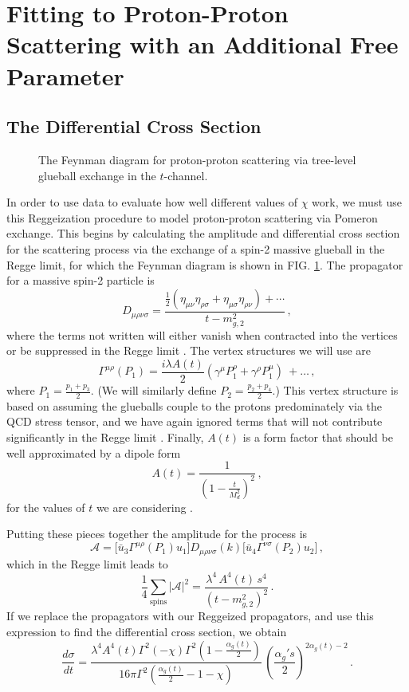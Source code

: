 \documentclass[aps, prd, preprintnumbers, floatfix, showpacs, showkeys, nofootinbib, 10pt]{revtex4-1}
\def\beq{\begin{equation}}
\def\eeq{\end{equation}}
\begin{document}
\section{\label{fitting} Fitting to Proton-Proton Scattering with an Additional Free Parameter}

\subsection{\label{fitfunction} The Differential Cross Section}

\begin{figure}
\begin{center}
\caption{\label{feyn} The Feynman diagram for proton-proton scattering via tree-level glueball exchange in the $t$-channel.}
\end{center}
\end{figure}

In order to use data to evaluate how well different values of $\chi$ work, we must use this Reggeization procedure to model proton-proton scattering via Pomeron exchange.  This begins by calculating the amplitude and differential cross section for the scattering process via the exchange of a spin-2 massive glueball in the Regge limit, for which the Feynman diagram is shown in FIG. \ref{feyn}.  The propagator for a massive spin-2 particle is 
\beq
D_{\mu\rho\nu\sigma} = \frac{\frac{1}{2}(\eta_{\mu\nu}\eta_{\rho\sigma} + \eta_{\mu\sigma}\eta_{\rho\nu}) + \cdots}{t - m_{g,2}^2} \, ,
\eeq
where the terms not written will either vanish when contracted into the vertices or be suppressed in the Regge limit \cite{prop}.  The vertex structures we will use are
\beq
\Gamma^{\mu\rho}(P_1) = \frac{i\lambda A(t)}{2}\left(\gamma^{\mu}P_1^{\rho} + \gamma^{\rho}P_1^{\mu}\right) \ + \dots \, ,
\eeq
where $P_1 = \frac{p_1 + p_3}{2}$.  (We will similarly define $P_2 = \frac{p_2 + p_4}{2}$.)  This vertex structure is based on assuming the glueballs couple to the protons predominately via the QCD stress tensor, and we have again ignored terms that will not contribute significantly in the Regge limit \cite{Domokos:2010ma}.  Finally, $A(t)$ is a form factor that should be well approximated by a dipole form
\beq
A(t) = \frac{1}{\left(1 - \frac{t}{M_d^2}\right)^2} \, ,
\eeq
for the values of $t$ we are considering \cite{Hong:2007dq}.  

Putting these pieces together the amplitude for the process is
\beq
\mathcal{A} = \Big[\bar{u}_3\Gamma^{\mu\rho}(P_1)u_1\Big]D_{\mu\rho\nu\sigma}(k)\Big[\bar{u}_4\Gamma^{\nu\sigma}(P_2)u_2\Big] \, ,
\eeq
which in the Regge limit leads to
\beq
\frac{1}{4}\sum_{\mathrm{spins}} |\mathcal{A}|^2 = \frac{\lambda^4 \, A^4(t) \, s^4}{(t - m_{g, 2}^2)^2} \, .
\eeq
If we replace the propagators with our Reggeized propagators, and use this expression to find the differential cross section, we obtain
\beq
\label{model}
\frac{d\sigma}{dt} = \frac{\lambda^4 A^4(t) \Gamma^2(-\chi)\Gamma^2\left(1 - \frac{\alpha_g(t)}{2}\right)}{16\pi \Gamma^2\left(\frac{\alpha_g(t)}{2} - 1 - \chi\right)} \,\left(\frac{\alpha_g' s}{2}\right)^{2\alpha_g(t) - 2} \, .
\eeq
\end{document}
